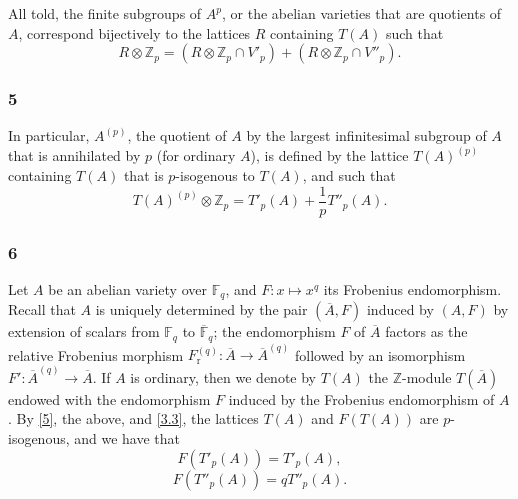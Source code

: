 \documentclass{article}
\newcommand{\FF}{\mathbb{F}}
\newcommand{\ZZ}{\mathbb{Z}}
\newcommand{\Fr}{F_\mathrm{r}}
\begin{document}
All told, the finite subgroups of $A^p$, or the abelian varieties that are quotients of $A$, correspond bijectively to the lattices $R$ containing $T(A)$ such that
\[
\label{4.1}
  R\otimes\ZZ_p = (R\otimes\ZZ_p \cap V'_p) + (R\otimes\ZZ_p \cap V''_p).
\tag{4.1}
\]


\subsubsection*{5}
\label{5}
In particular, $A^{(p)}$, the quotient of $A$ by the largest infinitesimal subgroup of $A$ that is annihilated by $p$ (for ordinary $A$), is defined by the lattice $T(A)^{(p)}$ containing $T(A)$ that is $p$-isogenous to $T(A)$, and such that
\[
  T(A)^{(p)}\otimes\ZZ_p = T'_p(A) + \frac1p T''_p(A).
\]


\subsubsection*{6}
\label{6}
Let $A$ be an abelian variety over $\FF_q$, and $F\colon x\mapsto x^q$ its Frobenius endomorphism.
Recall that $A$ is uniquely determined by the pair $(\overline{A},F)$ induced by $(A,F)$ by extension of scalars from $\FF_q$ to $\overline{\FF}_q$;
the endomorphism $F$ of $\overline{A}$ factors as the relative Frobenius morphism $\Fr^{(q)}\colon\overline{A}\to\overline{A}^{(q)}$ followed by an isomorphism $F'\colon\overline{A}^{(q)}\to\overline{A}$.
If $A$ is ordinary, then we denote by $T(A)$ the $\ZZ$-module $T(\overline{A})$ endowed with the endomorphism $F$ induced by the Frobenius endomorphism of $A$.
By \cref{5}, the above, and \cref{3.3}, the lattices $T(A)$ and $F(T(A))$ are $p$-isogenous, and we have that
\[
\label{6.1}
  F(T'_p(A)) = T'_p(A),
\tag{6.1}
\]
\[
\label{6.2}
  F(T''_p(A)) = qT''_p(A).
\tag{6.2}
\]
\end{document}
